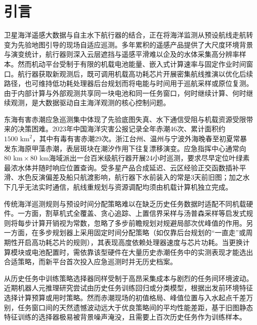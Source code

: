 \section{引言}

卫星海洋遥感大数据与自主水下航行器的结合，正在将海洋监测从预设航线走航转变为先验地图引导的现场自适应巡测\cite{fossum2019}。多年累积的遥感产品提供了大尺度环境背景与演变统计，航行器则深入云层遮挡与遥感平滑难以企及的水体采集高分辨率样本。然而机动平台受制于有限的机载电池能量、嵌入式计算速率与固定作业时间窗口\cite{xiao2020thinking, magnino2026metareasoning}。航行器获取新观测后，既可调用机载高功耗芯片开展密集航线推演以优化后续路径，也可维持低功耗处理器后台规划而将电能与时间用于巡航采样或原位复测\cite{horvitz1987reasoning, russell1991right, shen2025thinking}。由于内部计算与外部观测共享同一块电池和同一任务窗口，何时继续计算、何时继续观测，是大数据驱动自主海洋观测的核心控制问题\cite{hunt2021formalizing}。

东海有害赤潮应急巡测集中体现了先验底图失真、水下通信受阻与机载资源受限带来的决策困难\cite{fossum2019, lou2014diurnal}。2023年中国海洋灾害公报记录全年赤潮46次、累计面积约$1500\text{ km}^2$，其中有毒有害赤潮29次\cite{mnr2024bulletin}。浙江台州、温州与宁波外海晚春至初夏常暴发东海原甲藻赤潮\cite{zhao2025distinguishing}，表层斑块在潮汐作用下往复漂移演变\cite{lou2014diurnal}。应急指挥中心通常向$80\text{ km}\times 80\text{ km}$海域派出一台百米级航行器开展24小时巡测，要求尽早定位叶绿素最浓水体并随时响应位置查询\cite{remus100}。受多星产品合成延迟、云区经验正交函数插补平滑\cite{beckers2003dineof}、水色反演偏差\cite{ye2021cocts}及船只航渡影响，航行器下水前装入的常是3天前旧图；加之水下几乎无法实时通信，航线重规划与资源调配均须由机载计算机独立完成\cite{jetsonorinnx}。

传统海洋巡测规则与预设时间分配策略难以在缺乏历史任务数据时适配不同机载硬件。一方面，割草机式全覆盖\cite{galceran2013coverage}、贪心追踪、上置信界采样\cite{srinivas2012gpucb}与汤普森采样\cite{russo2018thompson}等启发式规则将每步计算开销视为常数，忽略了多步前瞻规划对规避局部次优峰值的作用\cite{hollinger2014sampling}。另一方面，在多步规划器上采用固定时间分配策略（如仅靠后台规划的“一直走”或周期性开启高功耗芯片的规则），其表现高度依赖处理器速度与芯片功耗。当更换计算模块或电池配置时，需依靠该型硬件在大量历史赤潮任务中的实测表现才能选出合适策略，而新平台首次投入应急巡测时并无历史档案。

从历史任务中训练策略选择器同样受制于高昂采集成本与剧烈的任务间环境波动。近期机器人元推理研究尝试由历史任务训练回归或分类模型，根据出发前环境特征选择计算预算或用时策略\cite{sung2021quit, magnino2026metareasoning}。然而赤潮现场的初值格局、峰值位置与入水起点千差万别，任务窗口间的天然遗憾波动远大于优良策略间的平均性能差距，基于旧图静态特征训练的选择器极易被背景噪声淹没，且需要上百次历史任务作为训练样本。

